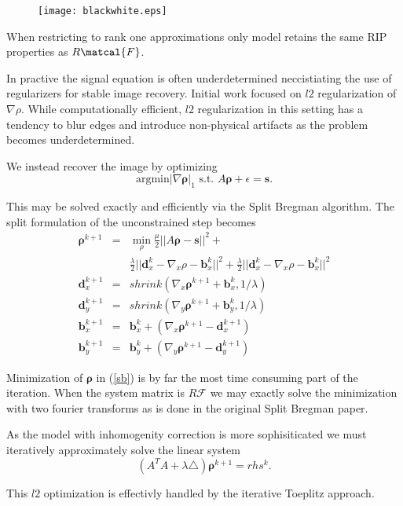 \documentclass[11pt]{amsart}
\theoremstyle{remark}
\begin{document}
\begin{figure}
\texttt{[image: blackwhite.eps]}
\end{figure}


When restricting to rank one approximations only model retains the
same RIP properties as $R\matcal{F}$.

In practive the signal equation is often underdetermined neccistiating the use of
regularizers for stable image recovery. Initial work focused on $l2$
regularization of $\nabla \rho$. While computationally efficient, $l2$
regularization in this setting has a tendency to blur edges and
introduce non-physical artifacts as the problem becomes underdetermined.

We instead recover the image by optimizing
\begin{equation}
\text{argmin} |\nabla \mathbf{\rho}|_1 \text{ s.t. } A\mathbf{\rho} +
\epsilon = \mathbf{s}.
\end{equation}

This may be solved exactly and efficiently via the Split Bregman
algorithm. The split formulation of the unconstrained step becomes
\begin{eqnarray}\label{sb}
\mathbf{\rho}^{k+1} &=& \min_\rho \frac{\mu}{2}||A\mathbf{\rho} - \mathbf{s}||^2 +\\
&& \frac{\lambda}{2}||\mathbf{d}_x^k - \nabla_x\rho - \mathbf{b}_x^k||^2 +  \frac{\lambda}{2}||\mathbf{d}_x^k - \nabla_x\rho - \mathbf{b}_x^k||^2 \\
\mathbf{d}_x^{k+1} &=& shrink(\nabla_x \mathbf{\rho}^{k+1} + \mathbf{b}_x^k, 1/\lambda)\\
\mathbf{d}_y^{k+1} &=& shrink(\nabla_y \mathbf{\rho}^{k+1} + \mathbf{b}_y^k, 1/\lambda)\\
\mathbf{b}_x^{k+1} &=& \mathbf{b}_x^{k} + (\nabla_x \mathbf{\rho}^{k+1} - \mathbf{d}_x^{k+1}) \\
\mathbf{b}_y^{k+1} &=& \mathbf{b}_y^{k} + (\nabla_y \mathbf{\rho}^{k+1} - \mathbf{d}_y^{k+1})
\end{eqnarray}


Minimization of $\mathbf{\rho}$ in (\ref{sb}) is by far the most time
consuming part of the iteration. When the system matrix is
$R\mathcal{F}$ we may exactly solve the minimization with two fourier
transforms as is done in the original Split Bregman paper.

As the model with inhomogenity correction is more sophisiticated we must  iteratively approximately solve the linear system
\begin{equation}\label{toep}
(A^TA + \lambda \triangle)\mathbf{\rho}^{k+1} = rhs^{k}.
\end{equation}

This $l2$ optimization is effectivly handled by the iterative Toeplitz
approach.







\end{document}
